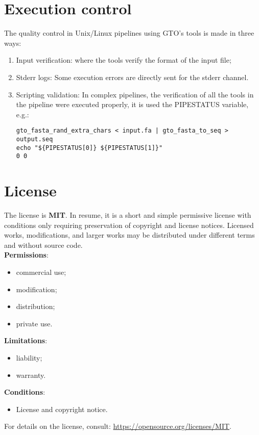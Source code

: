 \section{Execution control}
The quality control in Unix/Linux pipelines using GTO's tools is made in three ways:  
\begin{enumerate}
\item Input verification: where the tools verify the format of the input file; 

\item  Stderr logs: Some execution errors are directly sent for the stderr channel. 

\item Scripting validation: In complex pipelines, the verification of all the tools in the pipeline were executed properly, it is used the PIPESTATUS variable, e.g.:  
\begin{lstlisting}
gto_fasta_rand_extra_chars < input.fa | gto_fasta_to_seq > output.seq 
echo "${PIPESTATUS[0]} ${PIPESTATUS[1]}" 
0 0 
\end{lstlisting}

\end{enumerate}


\section{License}

The license is \textbf{MIT}. In resume, it is a short and simple permissive license with conditions only requiring preservation of copyright and license notices. Licensed works, modifications, and larger works may be distributed under different terms and without source code.\\
\textbf{Permissions}:
\begin{itemize}
	\item commercial use;
	\item modification;
	\item distribution;
	\item private use.
\end{itemize}
\textbf{Limitations}:
\begin{itemize}
	\item liability;
	\item warranty.
\end{itemize}
\textbf{Conditions}:
\begin{itemize}
        \item License and copyright notice.
\end{itemize}
For details on the license, consult: \url{https://opensource.org/licenses/MIT}.
